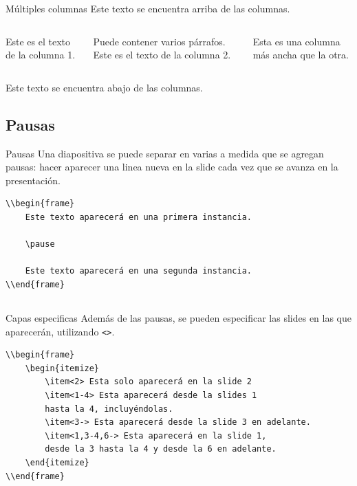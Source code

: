 \documentclass[../slides.tex]{subfiles}
\begin{document}
     \begin{frame}{Múltiples columnas}
    Este texto se encuentra arriba de las columnas.
    \vspace{1em}
\begin{columns}
        Este es el texto de la columna 1.
            
        Puede contener varios párrafos.
        Este es el texto de la columna 2.
            
        Esta es una columna más ancha que la otra.
\end{columns}
    \vspace{1em}
    Este texto se encuentra abajo de las columnas.
     \end{frame}

    \subsection{Pausas}
    
    \begin{frame}[fragile]{Pausas}
    	Una diapositiva se puede separar en varias a medida que se agregan pausas: hacer aparecer una linea nueva en la slide cada vez que se avanza en la presentación.
        \begin{verbatim}
\\begin{frame}
    Este texto aparecerá en una primera instancia.
    
    \pause
    
    Este texto aparecerá en una segunda instancia.
\\end{frame}
        \end{verbatim}

    \end{frame}

        \subsection{}
    
    \begin{frame}[fragile]{Capas especificas}
    	Además de las pausas, se pueden especificar las slides en las que aparecerán, utilizando \texttt{<>}.
        \begin{verbatim}
\\begin{frame}
    \begin{itemize}
        \item<2> Esta solo aparecerá en la slide 2
        \item<1-4> Esta aparecerá desde la slides 1 
        hasta la 4, incluyéndolas.
        \item<3-> Esta aparecerá desde la slide 3 en adelante.
        \item<1,3-4,6-> Esta aparecerá en la slide 1, 
        desde la 3 hasta la 4 y desde la 6 en adelante.
    \end{itemize}
\\end{frame}
        \end{verbatim}
    \end{frame}
    
\end{document}
